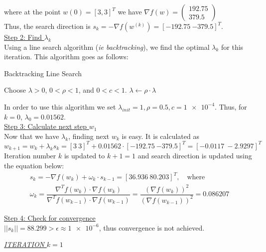 where at the point $w\left(0\right) = \left[3, 3\right]^T$ we have $\nabla f(w) = \left(\begin{array}{c}
	192.75 \\
	379.5
\end{array}\right)$\\
Thus, the search direction is $s_k = -\nabla f\left( w^{(k)}\right) = [\num{-192.75} \ \num{-379.5}]^T$.\\

\underline{Step 2: Find $\lambda_k$}\\
Using a line search algorithm (\textit{ie backtracking}), we find the optimal $\lambda_k$ for this iteration. This algorithm goes as follows:
\begin{algorithm}[H]
	\caption{Backtracking Line Search}
	\begin{algorithmic}
		\State Choose $\lambda > 0$, $0 < \rho < 1$, and $0 < c < 1$.
		\State $\lambda \gets \rho \cdot \lambda$
		\EndWhile
	\end{algorithmic}
\end{algorithm}
In order to use this algorithm we set $\lambda_{init} = 1, \rho=0.5, c=\num{1e-4}$.
Thus, for $k=0$, $\lambda_0 = 0.01562$.\\

\underline{Step 3: Calculate next step $w_{1}$}\\
Now that we have $\lambda_k$, finding next $w_k$ is easy. It is calculated as
\[
w_{k+1} = w_k + \lambda_k s_k = [3\ 3]^T + 0.01562 \cdot [\num{-192.75} \ \num{-379.5}]^T = [-0.0117\  -2.9297]^T
\]
Iteration number $k$ is updated to $k+1=1$ and search direction is updated using the equation below:
\[
\begin{gathered}
	s_{k} = - \nabla f(w_k) + \omega_k \cdot s_{k-1} = [36.936 \ 80.203]^T, \quad \text{where} \\ 
	\omega_k = \dfrac{\nabla^T f(w_k) \cdot \nabla f(w_k)}{\nabla^T f(w_{k-1}) \cdot \nabla f(w_{k-1})} = \dfrac{\left( \nabla f(w_k) \right)^2}{\left( \nabla f(w_{k-1}) \right)^2} =  0.086207
\end{gathered}
\]

\underline{Step 4: Check for convergence}\\[2mm]
$||s_k|| =  88.299 > \epsilon \approx \num{1e-6}$, thus convergence is not achieved.\\[3mm]

\begin{center}
	\underline{\textit{ITERATION} $k=1$}
\end{center}

